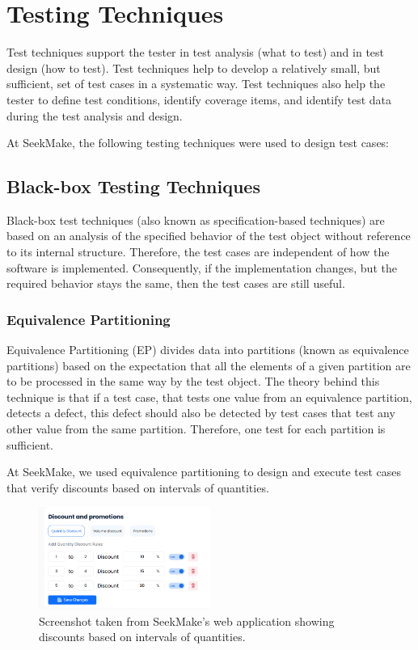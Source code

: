 \section{Testing Techniques}

Test techniques support the tester in test analysis (what to test) and in test design (how to test). Test
techniques help to develop a relatively small, but sufficient, set of test cases in a systematic way. Test
techniques also help the tester to define test conditions, identify coverage items, and identify test data
during the test analysis and design. \cite{istqbctfl4.0.1}

At SeekMake, the following testing techniques were used to design test cases:

\subsection{Black-box Testing Techniques}
Black-box test techniques (also known as specification-based techniques) are based on an analysis of
the specified behavior of the test object without reference to its internal structure. Therefore, the test
cases are independent of how the software is implemented. Consequently, if the implementation
changes, but the required behavior stays the same, then the test cases are still useful. \cite{istqbctfl4.0.1}

\subsubsection{Equivalence Partitioning}
Equivalence Partitioning (EP) divides data into partitions (known as equivalence partitions) based on the
expectation that all the elements of a given partition are to be processed in the same way by the test
object. The theory behind this technique is that if a test case, that tests one value from an equivalence
partition, detects a defect, this defect should also be detected by test cases that test any other value from
the same partition. Therefore, one test for each partition is sufficient. \cite{istqbctfl4.0.1}

At SeekMake, we used equivalence partitioning to design and execute test cases that verify discounts based on intervals of quantities.

\begin{figure}[H]
    \centering
    \includegraphics[width=0.5\textwidth]{project/images/ep.png}
    \caption{Screenshot taken from SeekMake's web application showing discounts based on intervals of quantities.}
    \label{fig:ep}
\end{figure}

